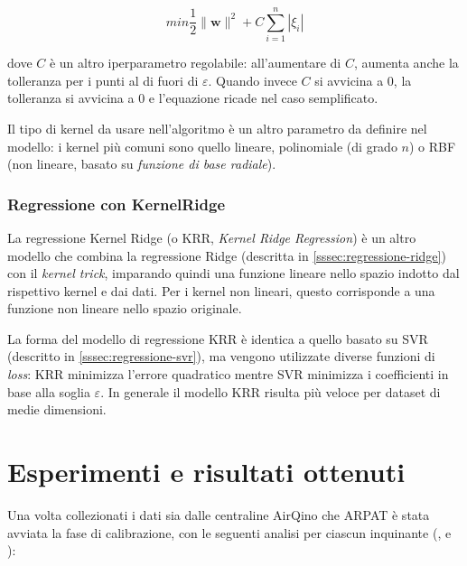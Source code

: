  $$min \frac{1}{2}\|\mathbf{w}\|^{2} + C \sum_{i=1}^{n}\left|\xi_{i}\right|$$\smallskip

dove $C$ è un altro iperparametro regolabile: all'aumentare di $C$, aumenta anche la tolleranza per i punti al di fuori di $\varepsilon$. Quando invece $C$ si avvicina a 0, la tolleranza si avvicina a 0 e l'equazione ricade nel caso semplificato.

Il tipo di kernel da usare nell'algoritmo è un altro parametro da definire nel modello: i kernel più comuni sono quello lineare, polinomiale (di grado $n$) o RBF (non lineare, basato su \textit{funzione di base radiale}).

\subsubsection{Regressione con KernelRidge}\label{sssec:regressione-kridge}
La regressione Kernel Ridge (o KRR, \textit{Kernel Ridge Regression}) è un altro modello che combina la regressione Ridge (descritta in \ref{sssec:regressione-ridge}) con il \textit{kernel trick}, imparando quindi una funzione lineare nello spazio indotto dal rispettivo kernel e dai dati. Per i kernel non lineari, questo corrisponde a una funzione non lineare nello spazio originale. \cite{krr}

La forma del modello di regressione KRR è identica a quello basato su SVR (descritto in \ref{sssec:regressione-svr}), ma vengono utilizzate diverse funzioni di \textit{loss}: KRR minimizza l'errore quadratico mentre SVR minimizza i coefficienti in base alla soglia $\varepsilon$. In generale il modello KRR risulta più veloce per dataset di medie dimensioni. \cite{krr}

\section{Esperimenti e risultati ottenuti}\label{sec:esperimenti}
Una volta collezionati i dati sia dalle centraline AirQino che ARPAT è stata avviata la fase di calibrazione, con le seguenti analisi per ciascun inquinante (,  e ):

